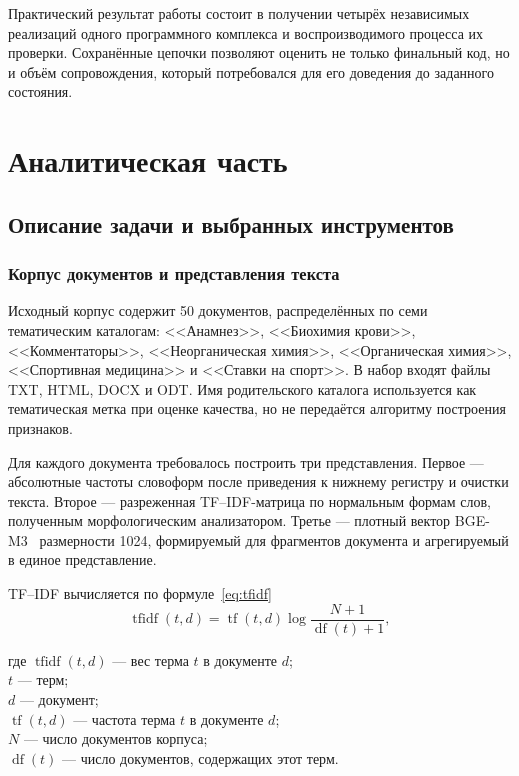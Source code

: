 \documentclass[a4paper,12pt]{extreport}
\begin{document}
Практический результат работы состоит в получении четырёх независимых реализаций одного программного комплекса и воспроизводимого процесса их проверки. Сохранённые цепочки позволяют оценить не только финальный код, но и объём сопровождения, который потребовался для его доведения до заданного состояния.

\chapter{Аналитическая часть}

\section{Описание задачи и выбранных инструментов}

\subsection{Корпус документов и представления текста}

Исходный корпус содержит 50 документов, распределённых по семи тематическим каталогам: <<Анамнез>>, <<Биохимия крови>>, <<Комментаторы>>, <<Неорганическая химия>>, <<Органическая химия>>, <<Спортивная медицина>> и <<Ставки на спорт>>. В набор входят файлы TXT, HTML, DOCX и ODT. Имя родительского каталога используется как тематическая метка при оценке качества, но не передаётся алгоритму построения признаков.

Для каждого документа требовалось построить три представления. Первое --- абсолютные частоты словоформ после приведения к нижнему регистру и очистки текста. Второе --- разреженная TF--IDF-матрица по нормальным формам слов, полученным морфологическим анализатором. Третье --- плотный вектор BGE-M3~\cite{bge-m3} размерности 1024, формируемый для фрагментов документа и агрегируемый в единое представление.

TF--IDF вычисляется по формуле~\eqref{eq:tfidf}
\begin{equation}
\label{eq:tfidf}
\operatorname{tfidf}(t,d)=\operatorname{tf}(t,d)\log\frac{N+1}{\operatorname{df}(t)+1},
\end{equation}

где $\operatorname{tfidf}(t,d)$ --- вес терма $t$ в документе $d$;\\
\phantom{где }$t$ --- терм;\\
\phantom{где }$d$ --- документ;\\
\phantom{где }$\operatorname{tf}(t,d)$ --- частота терма $t$ в документе $d$;\\
\phantom{где }$N$ --- число документов корпуса;\\
\phantom{где }$\operatorname{df}(t)$ --- число документов, содержащих этот терм.
\end{document}
